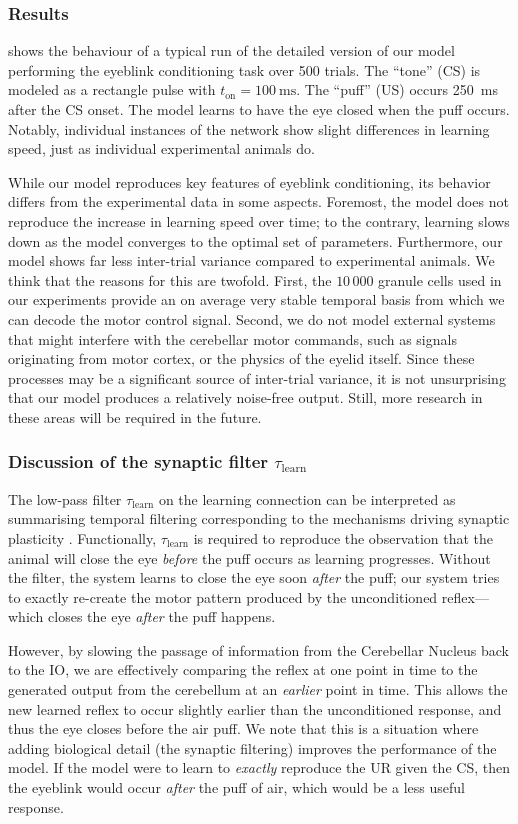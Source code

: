 \subsubsection{Results}
 shows the behaviour of a typical run of the detailed version of our model performing the eyeblink conditioning task over 500 trials.
The \enquote{tone} (CS) is modeled as a rectangle pulse with $t_\mathrm{on} = \SI{100}{\milli\second}$.
The \enquote{puff} (US) occurs \SI{250}{\milli\second} after the CS onset.
The model learns to have the eye closed when the puff occurs. Notably, individual instances of the network show slight differences in learning speed, just as individual experimental animals do.

While our model reproduces key features of eyeblink conditioning, its behavior differs from the experimental data in some aspects.
Foremost, the model does not reproduce the increase in learning speed over time; to the contrary, learning slows down as the model converges to the optimal set of parameters.
Furthermore, our model shows far less inter-trial variance compared to experimental animals.
We think that the reasons for this are twofold.
First, the $10\,000$ granule cells used in our experiments provide an on average very stable temporal basis from which we can decode the motor control signal.
Second, we do not model external systems that might interfere with the cerebellar motor commands, such as signals originating from motor cortex, or the physics of the eyelid itself.
Since these processes may be a significant source of inter-trial variance, it is not unsurprising that our model produces a relatively noise-free output.
Still, more research in these areas will be required in the future.


\subsubsection{Discussion of the synaptic filter $\tau_\mathrm{learn}$}
The low-pass filter $\tau_\mathrm{learn}$ on the learning connection can be interpreted as summarising temporal filtering corresponding to the mechanisms driving synaptic plasticity \citep[e.g.,][Chapter~66]{kandel2012principles}.
Functionally, $\tau_\mathrm{learn}$ is required to reproduce the observation that the animal will close the eye \emph{before} the puff occurs as learning progresses.
Without the filter, the system learns to close the eye soon \emph{after} the puff; our system tries to exactly re-create the motor pattern produced by the unconditioned reflex---which closes the eye \emph{after} the puff happens.

However, by slowing the passage of information from the Cerebellar Nucleus back to the IO, we are effectively comparing the reflex at one point in time to the generated output from the cerebellum at an \emph{earlier} point in time.
This allows the new learned reflex to occur slightly earlier than the unconditioned response, and thus the eye closes before the air puff.
We note that this is a situation where adding biological detail (the synaptic filtering) improves the performance of the model.
If the model were to learn to \textit{exactly} reproduce the UR given the CS, then the eyeblink would occur \textit{after} the puff of air, which would be a less useful response.
